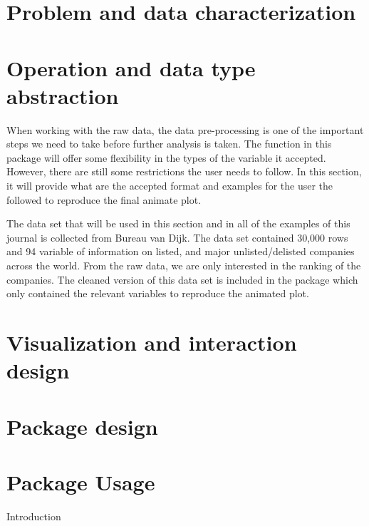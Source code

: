 \hypertarget{problem-and-data-characterization}{%
\section{Problem and data characterization}\label{problem-and-data-characterization}}

\hypertarget{operation-and-data-type-abstraction}{%
\section{Operation and data type abstraction}\label{operation-and-data-type-abstraction}}

When working with the raw data, the data pre-processing is one of the important steps we need to take before further analysis is taken. The function in this package will offer some flexibility in the types of the variable it accepted. However, there are still some restrictions the user needs to follow. In this section, it will provide what are the accepted format and examples for the user the followed to reproduce the final animate plot.

The data set that will be used in this section and in all of the examples of this journal is collected from Bureau van Dijk. The data set contained 30,000 rows and 94 variable of information on listed, and major unlisted/delisted companies across the world. From the raw data, we are only interested in the ranking of the companies. The cleaned version of this data set is included in the package which only contained the relevant variables to reproduce the animated plot.

\hypertarget{visualization-and-interaction-design}{%
\section{Visualization and interaction design}\label{visualization-and-interaction-design}}

\hypertarget{package-design}{%
\section{Package design}\label{package-design}}

\hypertarget{package-usage}{%
\section{Package Usage}\label{package-usage}}

Introduction

